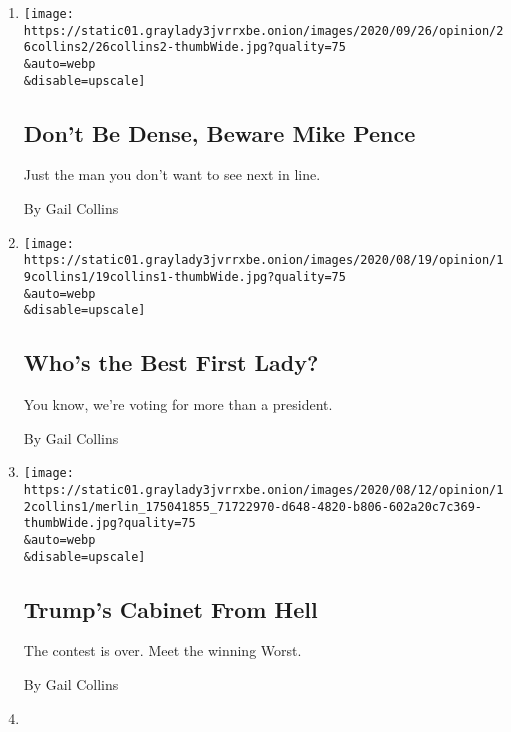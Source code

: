 \begin{enumerate}
\def\labelenumi{\arabic{enumi}.}
\item
  \href{/2020/08/26/opinion/mike-pence-trump.html}{}

  \texttt{[image: https://static01.graylady3jvrrxbe.onion/images/2020/09/26/opinion/26collins2/26collins2-thumbWide.jpg?quality=75\\\&auto=webp\\\&disable=upscale]}

  \hypertarget{dont-be-dense-beware-mike-pence}{%
  \subsection{Don't Be Dense, Beware Mike
  Pence}\label{dont-be-dense-beware-mike-pence}}

  Just the man you don't want to see next in line.

  By Gail Collins
\item
  \href{/2020/08/19/opinion/first-ladies-2020-election.html}{}

  \texttt{[image: https://static01.graylady3jvrrxbe.onion/images/2020/08/19/opinion/19collins1/19collins1-thumbWide.jpg?quality=75\\\&auto=webp\\\&disable=upscale]}

  \hypertarget{whos-the-best-first-lady}{%
  \subsection{Who's the Best First
  Lady?}\label{whos-the-best-first-lady}}

  You know, we're voting for more than a president.

  By Gail Collins
\item
  \href{/2020/08/12/opinion/trump-cabinet-bill-barr.html}{}

  \texttt{[image: https://static01.graylady3jvrrxbe.onion/images/2020/08/12/opinion/12collins1/merlin\_175041855\_71722970-d648-4820-b806-602a20c7c369-thumbWide.jpg?quality=75\\\&auto=webp\\\&disable=upscale]}

  \hypertarget{trumps-cabinet-from-hell}{%
  \subsection{Trump's Cabinet From
  Hell}\label{trumps-cabinet-from-hell}}

  The contest is over. Meet the winning Worst.

  By Gail Collins
\item
  \href{/2020/08/05/opinion/trump-cabinet.html}{}


\end{enumerate}

